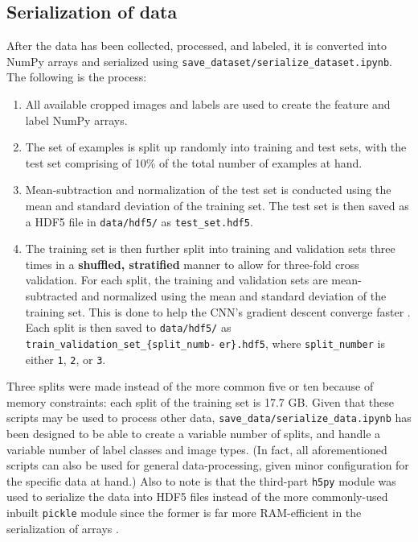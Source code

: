 \documentclass[a4paper, 11pt]{article} %
\begin{document}
	\subsection{Serialization of data}
		After the data has been collected, processed, and labeled, it is 
		converted into NumPy arrays and serialized using 
		\texttt{save\_dataset/serialize\_dataset.ipynb}.
		The following is the process:
		\begin{enumerate}
			\item All available cropped images and labels are used to create 
			the feature and label NumPy arrays.
			\item The set of examples is split up randomly into training 
			and test sets, with the test set comprising of 10\% of the total 
			number of examples at hand.
			\item Mean-subtraction and normalization of the test set is 
			conducted using the mean and standard deviation of the training 
			set. The test set is then saved as a HDF5 file in 
			\texttt{data/hdf5/} as \texttt{test\_set.hdf5}.
			\item The training set is then further split into training and 
			validation sets three times in a \textbf{shuffled, stratified} 
			manner to allow for three-fold cross validation. For each split, 
			the training and validation sets are mean-subtracted and normalized 
			using the mean and standard deviation of the training set. This is 
			done to help the CNN's gradient descent converge faster 
			\cite{sub-norm}\relax. Each split is then saved to
			\texttt{data/hdf5/} as 
			\texttt{train\_validation\_set\_\{split\_numb-} \texttt{er\}.hdf5}, 
			where 
			\texttt{split\_number} is either \texttt{1}, \texttt{2}, or 
			\texttt{3}.
		\end{enumerate}
		Three splits were made instead of the more common five or ten because 
		of memory constraints: each split of the training set is 17.7 GB. Given 
		that these scripts may be used to process other data, 
		\texttt{save\_data/serialize\_data.ipynb} has been designed to be able 
		to create a variable number of splits, and handle a variable number of 
		label classes and image types. (In fact, all aforementioned scripts can 
		also 
		be used for general data-processing, given minor configuration for the 
		specific data at hand.) Also to note is that the third-part 
		\texttt{h5py} module was used to serialize the data into HDF5 files 
		instead of the more commonly-used inbuilt \texttt{pickle} module since 
		the former is far more RAM-efficient in the serialization of 
		arrays \cite{hdf5-performance}\relax.
\end{document}
